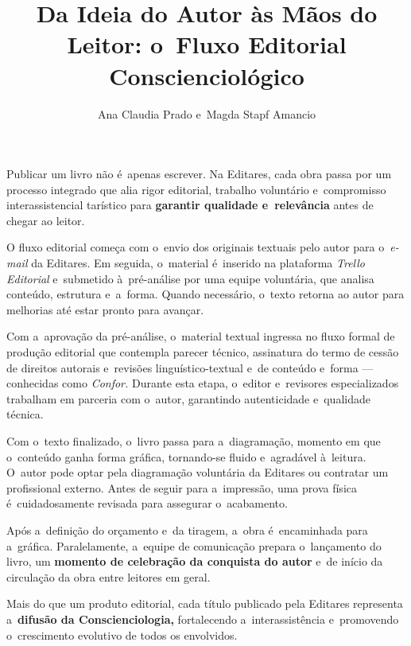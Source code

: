 \documentclass{gescons}
\author{Ana Claudia Prado e~Magda Stapf Amancio}
\title{Da Ideia do Autor às Mãos do Leitor: o~Fluxo Editorial Conscienciológico}
\begin{document}
    \makeentrevistatitle


    


Publicar um livro não é~apenas escrever. Na Editares, cada obra passa por um processo integrado que alia rigor editorial, trabalho voluntário e~compromisso interassistencial tarístico para \textbf{garantir qualidade e~relevância} antes de chegar ao leitor.

O fluxo editorial começa com o~envio dos originais textuais pelo autor para o~\emph{e-mail} da Editares. Em seguida, o~material é~inserido na plataforma \emph{Trello Editorial} e~submetido à~pré-análise por uma equipe voluntária, que analisa conteúdo, estrutura e~a~forma. Quando necessário, o~texto retorna ao autor para melhorias até estar pronto para avançar.

Com a~aprovação da pré-análise, o~material textual ingressa no fluxo formal de produção editorial que contempla parecer técnico, assinatura do termo de cessão de direitos autorais e~revisões linguístico-textual e~de conteúdo e~forma --- conhecidas como \emph{Confor.} Durante esta etapa, o~editor e~revisores especializados trabalham em parceria com o~autor, garantindo autenticidade e~qualidade técnica.

Com o~texto finalizado, o~livro passa para a~diagramação, momento em que o~conteúdo ganha forma gráfica, tornando-se fluido e~agradável à~leitura. O~autor pode optar pela diagramação voluntária da Editares ou contratar um profissional externo. Antes de seguir para a~impressão, uma prova física é~cuidadosamente revisada para assegurar o~acabamento.

Após a~definição do orçamento e~da tiragem, a~obra é~encaminhada para a~gráfica. Paralelamente, a~equipe de comunicação prepara o~lançamento do livro, um \textbf{momento de celebração da conquista do autor} e~de início da circulação da obra entre leitores em geral.

Mais do que um produto editorial, cada título publicado pela Editares representa a~\textbf{difusão da Conscienciologia,} fortalecendo a~interassistência e~promovendo o~crescimento evolutivo de todos os envolvidos.
\end{document}
